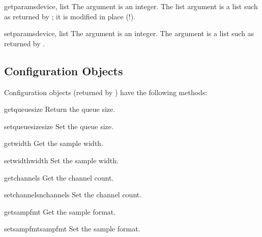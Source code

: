 \begin{funcdesc}{getparams}{device, list}
The  argument is an integer.  The list argument is a list
such as returned by ; it is modified in place
(!).
\end{funcdesc}

\begin{funcdesc}{setparams}{device, list}
The  argument is an integer.  The  argument is a
list such as returned by .
\end{funcdesc}


\subsection{Configuration Objects \label{al-config-objects}}

Configuration objects (returned by ) have the
following methods:

\begin{methoddesc}{getqueuesize}{}
Return the queue size.
\end{methoddesc}

\begin{methoddesc}{setqueuesize}{size}
Set the queue size.
\end{methoddesc}

\begin{methoddesc}{getwidth}{}
Get the sample width.
\end{methoddesc}

\begin{methoddesc}{setwidth}{width}
Set the sample width.
\end{methoddesc}

\begin{methoddesc}{getchannels}{}
Get the channel count.
\end{methoddesc}

\begin{methoddesc}{setchannels}{nchannels}
Set the channel count.
\end{methoddesc}

\begin{methoddesc}{getsampfmt}{}
Get the sample format.
\end{methoddesc}

\begin{methoddesc}{setsampfmt}{sampfmt}
Set the sample format.
\end{methoddesc}

